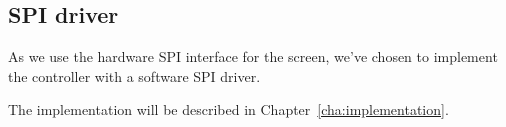 \subsection{SPI driver}

As we use the hardware SPI interface for the screen, we've chosen to implement the controller with a software SPI driver.

The implementation will be described in Chapter~\ref{cha:implementation}.